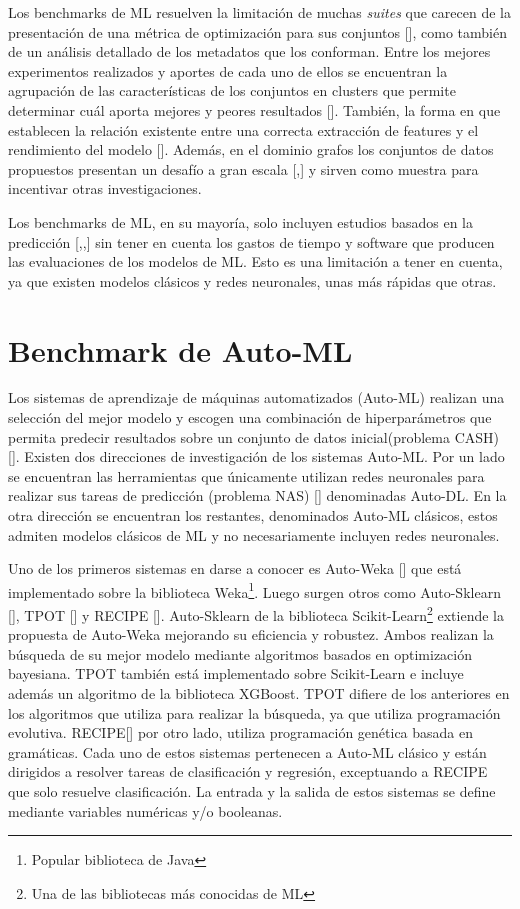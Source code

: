 Los benchmarks de ML resuelven la limitación de muchas \textit{suites} que carecen de la presentación de una métrica de optimización para sus conjuntos 
[\cite{44}], como también de un análisis detallado de los metadatos que los conforman. 
Entre los mejores experimentos realizados y aportes de cada uno de ellos se encuentran la agrupación de las características de los conjuntos 
en clusters que permite determinar cuál aporta mejores y peores resultados [\cite{2}]. También, la forma en que establecen la relación existente entre una correcta 
extracción de features y el rendimiento del modelo [\cite{4}]. Además, en el dominio grafos los conjuntos de datos propuestos presentan un desafío 
a gran escala [\cite{5},\cite{6}] y sirven como muestra para incentivar otras investigaciones.

Los benchmarks de ML, en su mayoría, solo incluyen estudios basados en la predicción [\cite{4},\cite{3},\cite{2}] sin tener en cuenta los gastos de tiempo y software 
que producen las evaluaciones de los modelos de ML. Esto es una limitación a tener en cuenta, ya que existen modelos clásicos y redes neuronales, unas más 
rápidas que otras.


\section{Benchmark de Auto-ML}\label{section:bench Auto-ML}

Los sistemas de aprendizaje de máquinas automatizados (Auto-ML) realizan una selección del mejor modelo y escogen una combinación de hiperparámetros que permita 
predecir resultados sobre un conjunto de datos inicial(problema CASH) [\cite{37}]. Existen dos direcciones de investigación de los sistemas Auto-ML.
Por un lado se encuentran las herramientas que únicamente utilizan redes neuronales para realizar sus tareas de predicción (problema NAS) [\cite{35}] denominadas Auto-DL. 
En la otra dirección se encuentran los restantes, denominados Auto-ML clásicos, estos admiten modelos clásicos de ML y no necesariamente incluyen redes neuronales.

Uno de los primeros sistemas en darse a conocer es Auto-Weka [\cite{8}] que está implementado sobre la biblioteca Weka\footnote{Popular biblioteca de Java}. Luego 
surgen otros como Auto-Sklearn [\cite{9}], TPOT [\cite{65}] y RECIPE [\cite{64}]. Auto-Sklearn de la biblioteca Scikit-Learn\footnote{Una de las bibliotecas más conocidas de ML} 
extiende la propuesta de Auto-Weka mejorando su eficiencia y robustez. Ambos realizan la búsqueda de su mejor modelo mediante algoritmos basados en optimización bayesiana.
TPOT también está implementado sobre Scikit-Learn e incluye además un algoritmo de la biblioteca XGBoost. TPOT difiere de los anteriores en los algoritmos que utiliza para 
realizar la búsqueda, ya que utiliza programación evolutiva. RECIPE[\cite{64}] por otro lado, utiliza programación genética basada en gramáticas. Cada uno de estos sistemas pertenecen
a Auto-ML clásico y están dirigidos a resolver tareas de clasificación y regresión, exceptuando a RECIPE que solo resuelve clasificación. La entrada y la salida de estos 
sistemas se define mediante variables numéricas y/o booleanas.  

